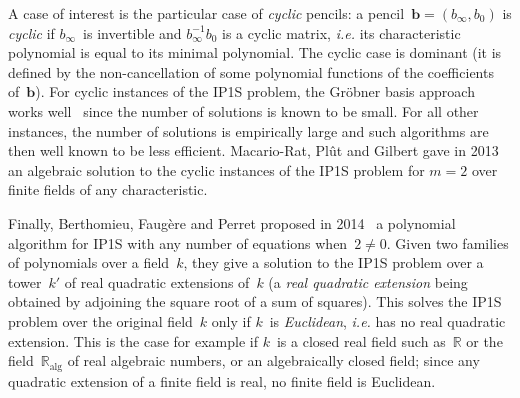 \documentclass{article}%
\begin{document}
A case of interest is the particular case of \emph{cyclic} pencils: a
pencil~$\bm{b} = (b_{∞}, b_0)$ is \emph{cyclic} if $b_{∞}$~is invertible
and $b_{∞}^{-1} b_{0}$ is a cyclic matrix, \emph{i.e.} its characteristic
polynomial is equal to its minimal polynomial. The cyclic case is
dominant (it is defined by the non-cancellation of some polynomial
functions of the coefficients of~$\bm{b}$). For cyclic instances of the
IP1S problem, the Gröbner basis approach works
well~\cite{DBLP:conf/pkc/BouillaguetFFP11} since the number of solutions
is known to be small. For all other instances, the number of solutions is
empirically large and such algorithms are then well known to be less
efficient.
Macario-Rat, Plût and Gilbert gave in 2013~\cite{MPG2013}
an algebraic solution to the cyclic instances of the IP1S problem
for $m=2$ over finite fields of any characteristic.

Finally, Berthomieu, Faugère and Perret
proposed in 2014~\cite{DBLP:journals/corr/BerthomieuFP13}
a polynomial algorithm for IP1S with any number of equations when~$2 ≠ 0$.
Given two families of polynomials over a field~$k$,
they give a solution to the IP1S problem
over a tower~$k'$ of real quadratic extensions of~$k$
(a \emph{real quadratic extension} being obtained by
adjoining the square root of a sum of squares).
This solves the IP1S problem over the original field~$k$ only if
$k$~is \emph{Euclidean}, \emph{i.e.} has no real quadratic extension.
This is the case for example if $k$~is a closed real field such as~$ℝ$
or the field~$ℝ_{\mathrm{alg}}$ of real algebraic numbers,
or an algebraically closed field;
since any quadratic extension of a finite field is real,
no finite field is Euclidean.
\end{document}
